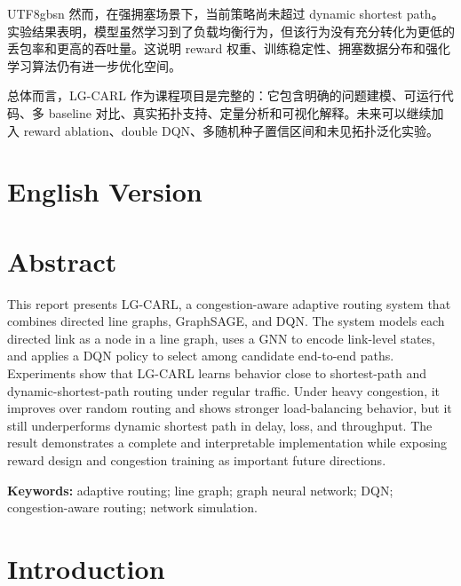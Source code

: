 \documentclass[9pt,a4paper,twocolumn,twoside]{rho-class/rho}
\begin{document}
\begin{CJK*}{UTF8}{gbsn}
然而，在强拥塞场景下，当前策略尚未超过 dynamic shortest path。实验结果表明，模型虽然学习到了负载均衡行为，但该行为没有充分转化为更低的丢包率和更高的吞吐量。这说明 reward 权重、训练稳定性、拥塞数据分布和强化学习算法仍有进一步优化空间。

总体而言，LG-CARL 作为课程项目是完整的：它包含明确的问题建模、可运行代码、多 baseline 对比、真实拓扑支持、定量分析和可视化解释。未来可以继续加入 reward ablation、double DQN、多随机种子置信区间和未见拓扑泛化实验。

\end{CJK*}

\clearpage
\setcounter{section}{0}
\setcounter{figure}{0}
\setcounter{table}{0}


\section*{English Version}

\section*{Abstract}

This report presents LG-CARL, a congestion-aware adaptive routing system that combines directed line graphs, GraphSAGE, and DQN. The system models each directed link as a node in a line graph, uses a GNN to encode link-level states, and applies a DQN policy to select among candidate end-to-end paths. Experiments show that LG-CARL learns behavior close to shortest-path and dynamic-shortest-path routing under regular traffic. Under heavy congestion, it improves over random routing and shows stronger load-balancing behavior, but it still underperforms dynamic shortest path in delay, loss, and throughput. The result demonstrates a complete and interpretable implementation while exposing reward design and congestion training as important future directions.

\textbf{Keywords:} adaptive routing; line graph; graph neural network; DQN; congestion-aware routing; network simulation.

\section{Introduction}
\end{document}
